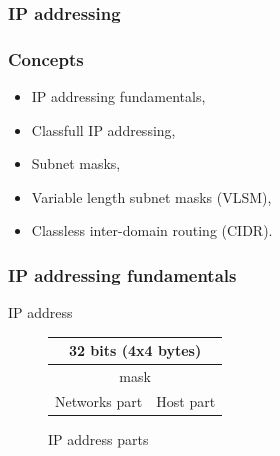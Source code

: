   \subsubsection{IP addressing}
  \begin{frame}
    \frametitle{Concepts}
      \begin{itemize}
        \item IP addressing fundamentals,\pause
        \item Classfull IP addressing,\pause
        \item Subnet masks,\pause
        \item Variable length subnet masks (VLSM),\pause
        \item Classless inter-domain routing (CIDR).
      \end{itemize}
  \end{frame}

  \begin{frame}
    \frametitle{IP addressing fundamentals}
    \begin{block}{IP address}
      \begin{figure}
        \centering
        \begin{tabular}{|c|c|}
          \multicolumn{2}{c}{32 bits (4x4 bytes)} \\ \hline
           \multicolumn{2}{|c|}{\color{brown}mask} \\ \hline
          \color{brown}Networks part & \color{blue}Host part \\ \hline
        \end{tabular}
        \caption{IP address parts}
        \label{fig:inside_ip_address}
      \end{figure}
    \end{block}
  \end{frame}

